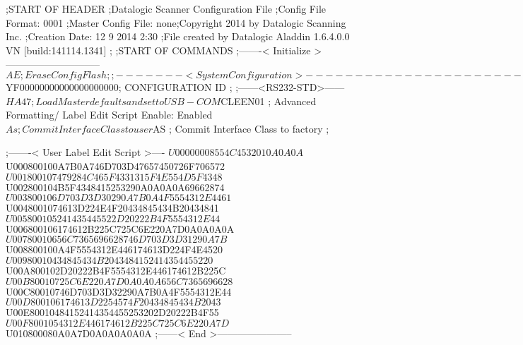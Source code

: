 ;START OF HEADER
;Datalogic Scanner Configuration File
;Config File Format: 0001
;Master Config File: none;Copyright 2014 by Datalogic Scanning Inc.
;Creation Date: 12 9 2014 2:30
;File created by Datalogic Aladdin 1.6.4.0.0 VN [build:141114.1341]
;
;START OF COMMANDS
;-------< Initialize >-----------------------------
$AE                 ; Erase Config Flash
;
;-------< System Configuration >-------------------------------
$YF00000000000000000000; CONFIGURATION ID
;
;------<RS232-STD>------
$HA47               ; Load Master defaults and set to USB-COM
$CLEEN01            ; Advanced Formatting/ Label Edit Script Enable: Enabled
$As                 ; Commit Interface Class to user
$AS                 ; Commit Interface Class to factory
;

;-------< User Label Edit Script >----
$U00000008554C4532010A0A0A
$U000800100A7B0A746D703D47657450726F706572
$U001800107479284C465F4331315F4E554D5F4348
$U002800104B5F4348415253290A0A0A0A69662874
$U003800106D703D3D30290A7B0A4F5554312E4461
$U0048001074613D224E4F20434845434B20434841
$U005800105241435445522D20222B4F5554312E44
$U006800106174612B225C725C6E220A7D0A0A0A0A
$U00780010656C7365696628746D703D3D31290A7B
$U008800100A4F5554312E446174613D224F4E4520
$U00980010434845434B2043484152414354455220
$U00A800102D20222B4F5554312E446174612B225C
$U00B80010725C6E220A7D0A0A0A656C7365696628
$U00C80010746D703D3D32290A7B0A4F5554312E44
$U00D800106174613D2254574F20434845434B2043
$U00E80010484152414354455253202D20222B4F55
$U00F8001054312E446174612B225C725C6E220A7D
$U010800080A0A7D0A0A0A0A0A
;------< End >-----------------------
